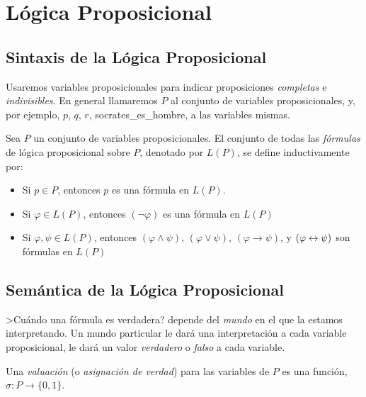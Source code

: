 


\section{L\'ogica Proposicional}

\subsection{Sintaxis de la L\'ogica Proposicional}

Usaremos variables proposicionales para indicar proposiciones {\em completas} e {\em indivisibles}.
En general llamaremos $P$ al conjunto de variables proposicionales, y, por ejemplo,
$p$, $q$, $r$, socrates\_es\_hombre, a las variables mismas.

\begin{definicion}
Sea $P$ un conjunto de variables proposicionales.
El conjunto de todas las {\em f\'ormulas} de l\'ogica proposicional sobre $P$,
denotado por $L(P)$, se define inductivamente por:
\begin{itemize}
\item Si $p\in P$, entonces $p$ es una f\'ormula en $L(P)$.
\item Si $\varphi\in L(P)$, entonces $(\neg \varphi)$ es una f\'ormula en $L(P)$
\item Si $\varphi,\psi\in L(P)$, entonces $(\varphi \wedge \psi)$,
$(\varphi \vee \psi)$, $(\varphi \to \psi)$, y $(\varphi \leftrightarrow \psi)$ son f\'ormulas en $L(P)$
\end{itemize}
\end{definicion}

\subsection{Sem\'antica de la L\'ogica Proposicional}

>Cu\'ando una f\'ormula es verdadera? depende del {\em mundo} en el que la estamos interpretando.
Un mundo particular le dar\'a una interpretaci\'on a cada variable proposicional, le dar\'a un
valor {\em verdadero} o {\em falso} a cada variable.

Una {\em valuaci\'on} (o {\em asignaci\'on de verdad}) para las variables de
$P$ es una funci\'on, $\sigma:P\to \{0,1\}$.

